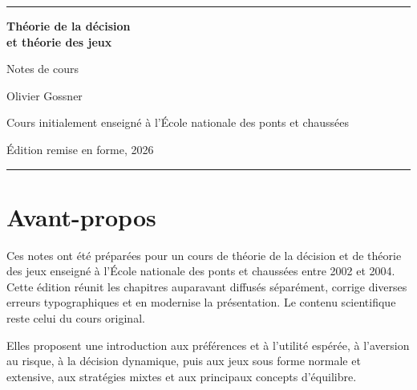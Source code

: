 \documentclass[11pt,a4paper,openany]{book}
\begin{document}
\frontmatter
\begin{titlepage}
\centering
\vspace*{0.16\textheight}
{\color{forest}\rule{\textwidth}{1.4pt}\par}
\vspace{1.6em}
{\Huge\bfseries Théorie de la décision\\[0.25em] et théorie des jeux\par}
\vspace{1.4em}
{\Large Notes de cours\par}
\vspace{2.2em}
{\LARGE Olivier Gossner\par}
\vfill
{\large Cours initialement enseigné à l'École nationale des ponts et chaussées\par}
\vspace{0.6em}
{\normalsize Édition remise en forme, 2026\par}
\vspace{1.6em}
{\color{terracotta}\rule{0.55\textwidth}{1pt}\par}
\end{titlepage}

\chapter*{Avant-propos}
Ces notes ont été préparées pour un cours de théorie de la décision et de théorie des jeux enseigné à l'École nationale des ponts et chaussées entre 2002 et 2004. Cette édition réunit les chapitres auparavant diffusés séparément, corrige diverses erreurs typographiques et en modernise la présentation. Le contenu scientifique reste celui du cours original.

Elles proposent une introduction aux préférences et à l'utilité espérée, à l'aversion au risque, à la décision dynamique, puis aux jeux sous forme normale et extensive, aux stratégies mixtes et aux principaux concepts d'équilibre.

\tableofcontents
\mainmatter





\end{document}
